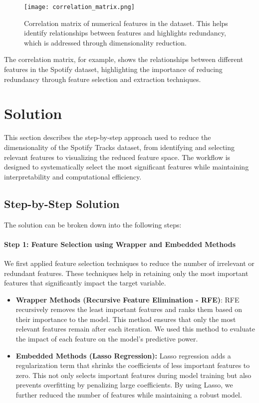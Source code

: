 \documentclass{article}
\begin{document}
\begin{figure}[h!]
    \centering
    \texttt{[image: correlation\_matrix.png]}
    \caption{Correlation matrix of numerical features in the dataset. This helps identify relationships between features and highlights redundancy, which is addressed through dimensionality reduction.}
\end{figure}

The correlation matrix, for example, shows the relationships between different features in the Spotify dataset, highlighting the importance of reducing redundancy through feature selection and extraction techniques.

\section{Solution }

This section describes the step-by-step approach used to reduce the dimensionality of the Spotify Tracks dataset, from identifying and selecting relevant features to visualizing the reduced feature space. The workflow is designed to systematically select the most significant features while maintaining interpretability and computational efficiency.

\subsection{Step-by-Step Solution}

The solution can be broken down into the following steps:

\paragraph{Step 1: Feature Selection using Wrapper and Embedded Methods}
We first applied feature selection techniques to reduce the number of irrelevant or redundant features. These techniques help in retaining only the most important features that significantly impact the target variable.

\begin{itemize}
    \item \textbf{Wrapper Methods (Recursive Feature Elimination - RFE)}: RFE recursively removes the least important features and ranks them based on their importance to the model. This method ensures that only the most relevant features remain after each iteration. We used this method to evaluate the impact of each feature on the model's predictive power.
    
    \item \textbf{Embedded Methods (Lasso Regression):} Lasso regression adds a regularization term that shrinks the coefficients of less important features to zero. This not only selects important features during model training but also prevents overfitting by penalizing large coefficients. By using Lasso, we further reduced the number of features while maintaining a robust model.
\end{itemize}
\end{document}
